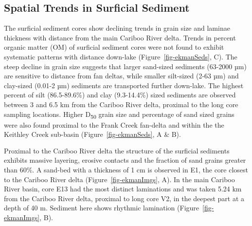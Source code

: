 \documentclass[
  letterpaper,
  DIV=11,
  numbers=noendperiod]{scrartcl}
\begin{document}
\hypertarget{spatial}{%
\subsection{Spatial Trends in Surficial Sediment}\label{spatial}}

The surficial sediment cores show declining trends in grain size and
laminae thickness with distance from the main Cariboo River delta.
Trends in percent organic matter (OM) of surficial sediment cores were
not found to exhibit systematic patterns with distance down-lake
(Figure~\ref{fig-ekmanSeds}, C). The steep decline in grain size
suggests that larger sand-sized sediments (63-2000 µm) are sensitive to
distance from fan deltas, while smaller silt-sized (2-63 µm) and
clay-sized (0.01-2 µm) sediments are transported further down-lake. The
highest percent of silt (86.5-89.6\%) and clay (9.3-14.4\%) sized
sediments are observed between 3 and 6.5 km from the Cariboo River
delta, proximal to the long core sampling locations. Higher
D\textsubscript{50} grain size and percentage of sand sized grains were
also found proximal to the Frank Creek fan-delta and within the the
Keithley Creek sub-basin (Figure~\ref{fig-ekmanSeds}, A \& B).

Proximal to the Cariboo River delta the structure of the surficial
sediments exhibits massive layering, erosive contacts and the fraction
of sand grains greater than 60\%. A sand-bed with a thickness of 1 cm is
observed in E1, the core closest to the Cariboo River delta
(Figure~\ref{fig-ekmanImgs}, A). In the main Cariboo River basin, core
E13 had the most distinct laminations and was taken 5.24 km from the
Cariboo River delta, proximal to long core V2, in the deepest part at a
depth of 40 m. Sediment here shows rhythmic lamination
(Figure~\ref{fig-ekmanImgs}, B).
\end{document}
